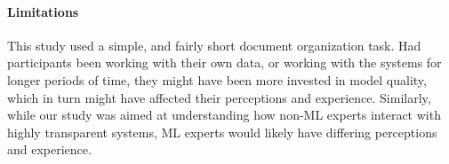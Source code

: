 \paragraph{Limitations}
This study used a simple, and fairly short document organization task. Had participants been working with their own data, or working with the systems for longer periods of time, they might have been more invested in model quality, which in turn might have affected their perceptions and experience. Similarly, while our study was aimed at understanding how non-ML experts interact with highly transparent systems, ML experts would likely have differing perceptions and experience.



